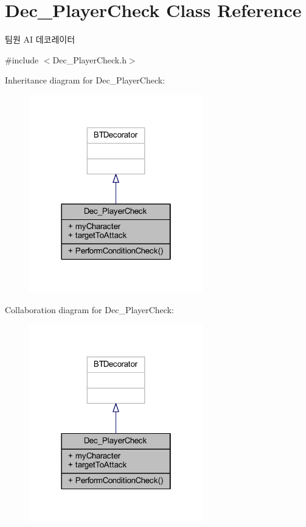 \hypertarget{class_dec___player_check}{}\section{Dec\+\_\+\+Player\+Check Class Reference}
\label{class_dec___player_check}


팀원 AI 데코레이터  




{\ttfamily \#include $<$Dec\+\_\+\+Player\+Check.\+h$>$}



Inheritance diagram for Dec\+\_\+\+Player\+Check\+:\nopagebreak
\begin{figure}[H]
\begin{center}
\leavevmode
\includegraphics[width=214pt]{class_dec___player_check__inherit__graph}
\end{center}
\end{figure}


Collaboration diagram for Dec\+\_\+\+Player\+Check\+:\nopagebreak
\begin{figure}[H]
\begin{center}
\leavevmode
\includegraphics[width=214pt]{class_dec___player_check__coll__graph}
\end{center}
\end{figure}
